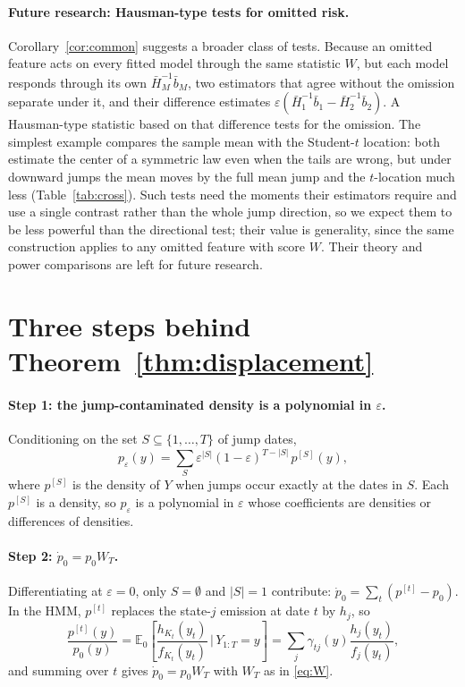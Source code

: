 \documentclass[11pt,a4paper]{article}
\theoremstyle{definition}
\theoremstyle{remark}
\newcommand{\E}{\mathbb{E}}
\begin{document}
\paragraph{Future research: Hausman-type tests for omitted risk.} Corollary~\ref{cor:common} suggests a broader class of tests. Because an omitted feature acts on every fitted model through the same statistic $W$, but each model responds through its own $\bar H_M^{-1}\bar b_M$, two estimators that agree without the omission separate under it, and their difference estimates $\varepsilon(\bar H_1^{-1}\bar b_1-\bar H_2^{-1}\bar b_2)$. A Hausman-type statistic \citep{hausman1978} based on that difference tests for the omission. The simplest example compares the sample mean with the Student-$t$ location: both estimate the center of a symmetric law even when the tails are wrong, but under downward jumps the mean moves by the full mean jump and the $t$-location much less (Table~\ref{tab:cross}). Such tests need the moments their estimators require and use a single contrast rather than the whole jump direction, so we expect them to be less powerful than the directional test; their value is generality, since the same construction applies to any omitted feature with score $W$. Their theory and power comparisons are left for future research.

\appendix
\section{Three steps behind Theorem~\ref{thm:displacement}}\label{app:steps}
\paragraph{Step 1: the jump-contaminated density is a polynomial in $\varepsilon$.} Conditioning on the set $S\subseteq\{1,\dots,T\}$ of jump dates,
\[
p_\varepsilon(y)=\sum_{S}\varepsilon^{|S|}(1-\varepsilon)^{T-|S|}\,p^{[S]}(y),
\]
where $p^{[S]}$ is the density of $Y$ when jumps occur exactly at the dates in $S$. Each $p^{[S]}$ is a density, so $p_\varepsilon$ is a polynomial in $\varepsilon$ whose coefficients are densities or differences of densities.

\paragraph{Step 2: $\dot p_0=p_0W_T$.} Differentiating at $\varepsilon=0$, only $S=\emptyset$ and $|S|=1$ contribute: $\dot p_0=\sum_t(p^{[t]}-p_0)$. In the HMM, $p^{[t]}$ replaces the state-$j$ emission at date $t$ by $h_j$, so
\[
\frac{p^{[t]}(y)}{p_0(y)}=\E_0\!\left[\frac{h_{K_t}(y_t)}{f_{K_t}(y_t)}\,\Big|\,Y_{1:T}=y\right]=\sum_j\gamma_{tj}(y)\frac{h_j(y_t)}{f_j(y_t)},
\]
and summing over $t$ gives $\dot p_0=p_0W_T$ with $W_T$ as in \eqref{eq:W}.
\end{document}
